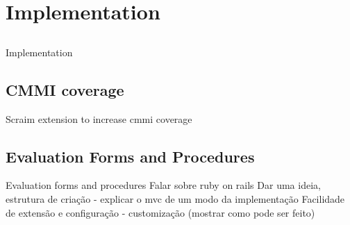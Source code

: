 \chapter{Implementation} \label{chap:implementation}

\section*{}

Implementation

\section{CMMI coverage} \label{sec:cmmicoverage}
Scraim extension to increase cmmi coverage


\section{Evaluation Forms and Procedures} \label{sec:evaluation}
	Evaluation forms and procedures
	Falar sobre ruby on rails
	Dar uma ideia, estrutura de criação - explicar o mvc de um modo da implementação
	Facilidade de extensão e configuração - customização (mostrar como pode ser feito)

